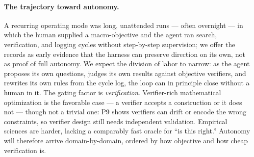 \documentclass[11pt]{article}
\begin{document}
\paragraph{The trajectory toward autonomy.}
A recurring operating mode was long, unattended runs --- often overnight --- in which the human
supplied a macro-objective and the agent ran search, verification, and logging cycles without
step-by-step supervision; we offer the records as early evidence that the harness can preserve
direction on its own, not as proof of full autonomy. We expect the division of labor to narrow:
as the agent proposes its own questions, judges its own results against objective verifiers, and
rewrites its own rules from the cycle log, the loop can in principle close without a human in it.
The gating factor is \emph{verification}. Verifier-rich mathematical optimization is the
favorable case --- a verifier accepts a construction or it does not --- though not a trivial
one: P9 shows verifiers can drift or encode the wrong constraints, so verifier design still
needs independent validation. Empirical sciences are harder, lacking a comparably fast oracle
for ``is this right.'' Autonomy will therefore arrive domain-by-domain, ordered by how objective
and how cheap verification is.
\end{document}
